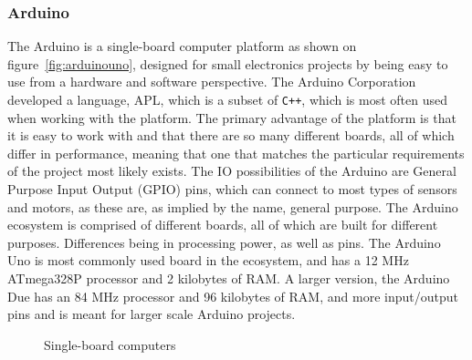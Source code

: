 \subsubsection{Arduino}
The Arduino is a single-board computer platform as shown on figure~\autoref{fig:arduinouno}, designed for small electronics projects by being easy to use from a hardware and software perspective.
The Arduino Corporation developed a language, APL, which is a subset of \texttt{C++}, which is most often used when working with the platform.
The primary advantage of the platform is that it is easy to work with and that there are so many different boards, all of which differ in performance, meaning that one that matches the particular requirements of the project most likely exists.
The IO possibilities of the Arduino are General Purpose Input Output (GPIO) pins, which can connect to most types of sensors and motors, as these are, as implied by the name, general purpose.
The Arduino ecosystem is comprised of different boards, all of which are built for different purposes.
Differences being in processing power, as well as pins.
The Arduino Uno is most commonly used board in the ecosystem\cite{ArduinoUno3}, and has a 12 MHz ATmega328P processor and 2 kilobytes of RAM.
A larger version, the Arduino Due has an 84 MHz processor and 96 kilobytes of RAM\cite{ArduinoDue}, and more input/output pins and is meant for larger scale Arduino projects.

\begin{figure}[!tbp]
	\centering
	\hfill
	\caption{Single-board computers}
\end{figure}

